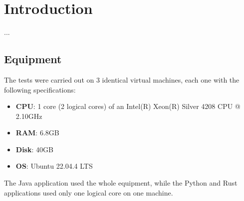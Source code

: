 \section{Introduction}
...
\subsection{Equipment}
The tests were carried out on 3 identical virtual machines, each one with the following specifications:
\begin{itemize}
	\item \textbf{CPU}: 1 core (2 logical cores) of an Intel(R) Xeon(R) Silver 4208 CPU @ 2.10GHz
	\item \textbf{RAM}: 6.8GB
	\item \textbf{Disk}: 40GB
	\item \textbf{OS}: Ubuntu 22.04.4 LTS
\end{itemize}
The Java application used the whole equipment, while the Python and Rust applications used only one 
logical core on one machine.